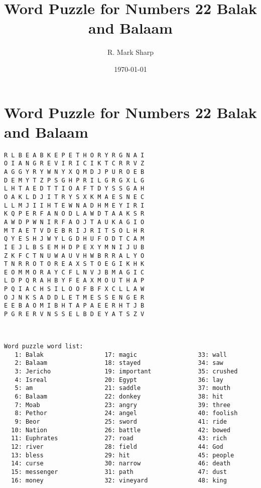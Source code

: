 \documentclass[12pt,a4paper,article]{memoir}\usepackage[]{graphicx}\usepackage[]{color}
\title{Word Puzzle for Numbers 22 Balak and Balaam}
\subtitle{}
\author{R. Mark Sharp}
\date{\today}
\begin{document}
\maketitle






\clearpage
\Large
\section*{Word Puzzle for Numbers 22 Balak and Balaam}
\begin{verbatim}
R L B E A B K E P E T H O R Y R G N A I 
O I A N G R E V I R I C I K T C R R V Z 
A G G Y R Y W N Y X Q M D J P U R O E B 
D E M Y T Z P S G H P R I L G R G X L G 
L H T A E D T T I O A F T D Y S S G A H 
O A K L D J I T R Y S X K M A E S N E C 
L L M J I I H T E W N A D H M E Y I R I 
K Q P E R F A N O D L A W D T A A K S R 
A W D P W N I R F A O J T A U K A G I O 
M T A E T V D E B R I J R I T S O L H R 
Q Y E S H J W Y L G D H U F O D T C A M 
I E J L B S E M H D P E X Y M N I J U B 
Z K F C T N U W A U V H W B R R A L Y O 
T N R R O T O R E A X S T O E G I K H K 
E O M M O R A Y C F L N V J B M A G I C 
L D P Q R A H B Y F E A X M O U T H A P 
P Q I A C H S I L O O F B F X C L L A W 
O J N K S A D D L E T M E S S E N G E R 
E E B A O M I B H T A P A E E R H T J B 
P G R E R V N S S E L B D E Y A T S Z V 

\end{verbatim}
\clearpage
\normalsize
\begin{verbatim}


Word puzzle word list:
   1: Balak                 17: magic                 33: wall
   2: Balaam                18: stayed                34: saw
   3: Jericho               19: important             35: crushed
   4: Isreal                20: Egypt                 36: lay
   5: am                    21: saddle                37: mouth
   6: Balaam                22: donkey                38: hit
   7: Moab                  23: angry                 39: three
   8: Pethor                24: angel                 40: foolish
   9: Beor                  25: sword                 41: ride
  10: Nation                26: battle                42: bowed
  11: Euphrates             27: road                  43: rich
  12: river                 28: field                 44: God
  13: bless                 29: hit                   45: people
  14: curse                 30: narrow                46: death
  15: messenger             31: path                  47: dust
  16: money                 32: vineyard              48: king

\end{verbatim}
\end{document}
